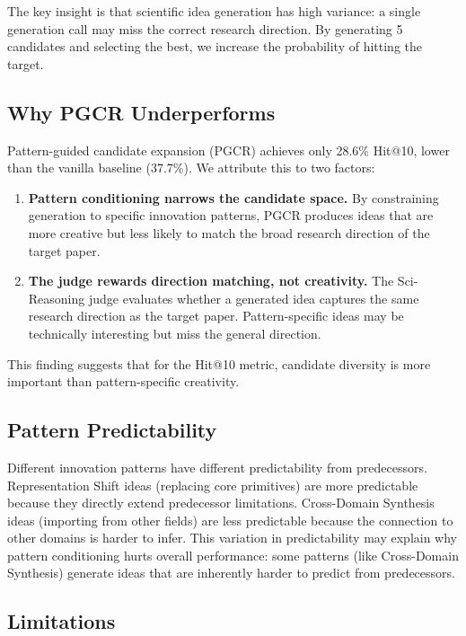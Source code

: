 \documentclass[conference]{IEEEtran}
\begin{document}
The key insight is that scientific idea generation has high variance: a single generation call may miss the correct research direction. By generating 5 candidates and selecting the best, we increase the probability of hitting the target.

\subsection{Why PGCR Underperforms}

Pattern-guided candidate expansion (PGCR) achieves only 28.6\% Hit@10, lower than the vanilla baseline (37.7\%). We attribute this to two factors:

\begin{enumerate}
    \item \textbf{Pattern conditioning narrows the candidate space.} By constraining generation to specific innovation patterns, PGCR produces ideas that are more creative but less likely to match the broad research direction of the target paper.
    \item \textbf{The judge rewards direction matching, not creativity.} The Sci-Reasoning judge evaluates whether a generated idea captures the same research direction as the target paper. Pattern-specific ideas may be technically interesting but miss the general direction.
\end{enumerate}

This finding suggests that for the Hit@10 metric, candidate diversity is more important than pattern-specific creativity.

\subsection{Pattern Predictability}

Different innovation patterns have different predictability from predecessors. Representation Shift ideas (replacing core primitives) are more predictable because they directly extend predecessor limitations. Cross-Domain Synthesis ideas (importing from other fields) are less predictable because the connection to other domains is harder to infer. This variation in predictability may explain why pattern conditioning hurts overall performance: some patterns (like Cross-Domain Synthesis) generate ideas that are inherently harder to predict from predecessors.

\subsection{Limitations}
\end{document}
